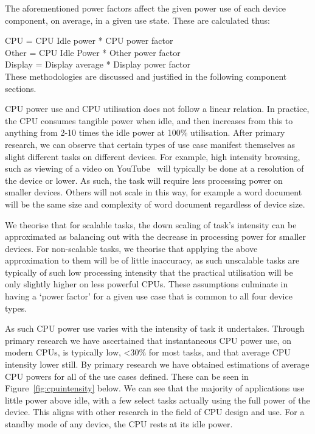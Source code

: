 \documentclass[conference]{IEEEtran}
\begin{document}

The aforementioned power factors affect the given power use of each
device component, on average, in a given use state. These are
calculated thus:

CPU = CPU Idle power * CPU power factor\\
Other = CPU Idle Power * Other power factor\\
Display = Display average * Display power factor\\

These methodologies are discussed and justified in the following
component sections.



CPU power use and CPU utilisation does not follow a linear
relation. In practice, the CPU consumes tangible power when idle, and
then increases from this to anything from 2-10 times the idle power at
100\% utilisation.  After primary research, we can observe that
certain types of use case manifest themselves as slight different
tasks on different devices. For example, high intensity browsing, such
as viewing of a video on YouTube~\cite{schien-et-al:2013} will
typically be done at a resolution of the device or lower. As such, the
task will require less processing power on smaller devices. Others
will not scale in this way, for example a word document will be the
same size and complexity of word document regardless of device size.

We theorise that for scalable tasks, the down scaling of task’s
intensity can be approximated as balancing out with the decrease in
processing power for smaller devices. For non-scalable tasks, we
theorise that applying the above approximation to them will be of
little inaccuracy, as such unscalable tasks are typically of such low
processing intensity that the practical utilisation will be only
slightly higher on less powerful CPUs.  These assumptions culminate in
having a `power factor' for a given use case that is common to all
four device types.

As such CPU power use varies with the intensity of task it
undertakes. Through primary research we have ascertained that
instantaneous CPU power use, on modern CPUs, is typically low, <30\%
for most tasks, and that average CPU intensity lower still. By primary
research we have obtained estimations of average CPU powers for all of
the use cases defined. These can be seen in
Figure~\ref{fig:cpuintensity} below. We can see that the majority of
applications use little power above idle, with a few select tasks
actually using the full power of the device. This aligns with other
research in the field of CPU design and use. For a standby mode of any
device, the CPU rests at its idle power.
\end{document}
